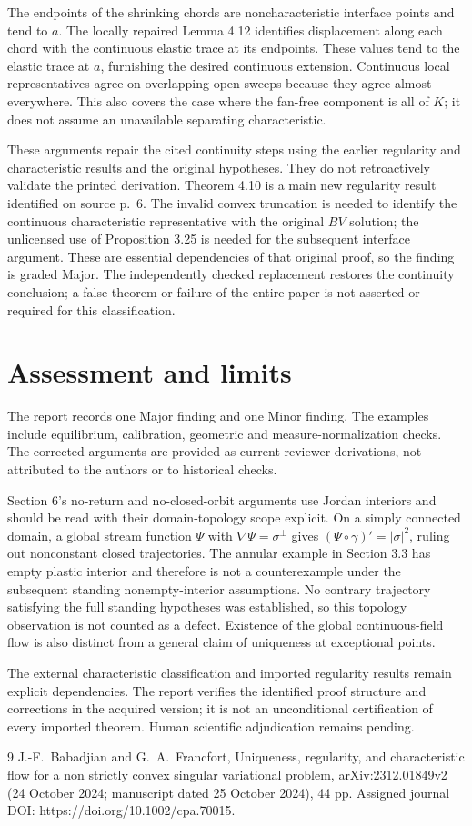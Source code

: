 \documentclass[10pt]{article}
\begin{document}
The endpoints of the shrinking chords are noncharacteristic interface points and tend to \(a\). The locally repaired Lemma 4.12 identifies displacement along each chord with the continuous elastic trace at its endpoints. These values tend to the elastic trace at \(a\), furnishing the desired continuous extension. Continuous local representatives agree on overlapping open sweeps because they agree almost everywhere. This also covers the case where the fan-free component is all of \(K\); it does not assume an unavailable separating characteristic.\par
These arguments repair the cited continuity steps using the earlier regularity and characteristic results and the original hypotheses. They do not retroactively validate the printed derivation. Theorem 4.10 is a main new regularity result identified on source p. 6. The invalid convex truncation is needed to identify the continuous characteristic representative with the original \(BV\) solution; the unlicensed use of Proposition 3.25 is needed for the subsequent interface argument. These are essential dependencies of that original proof, so the finding is graded Major. The independently checked replacement restores the continuity conclusion; a false theorem or failure of the entire paper is not asserted or required for this classification.\par
\section*{Assessment and limits}
The report records one Major finding and one Minor finding. The examples include equilibrium, calibration, geometric and measure-normalization checks. The corrected arguments are provided as current reviewer derivations, not attributed to the authors or to historical checks.\par
Section 6’s no-return and no-closed-orbit arguments use Jordan interiors and should be read with their domain-topology scope explicit. On a simply connected domain, a global stream function \(\Psi\) with \(\nabla\Psi=\sigma^\perp\) gives \((\Psi\circ\gamma)'=|\sigma|^2\), ruling out nonconstant closed trajectories. The annular example in Section 3.3 has empty plastic interior and therefore is not a counterexample under the subsequent standing nonempty-interior assumptions. No contrary trajectory satisfying the full standing hypotheses was established, so this topology observation is not counted as a defect. Existence of the global continuous-field flow is also distinct from a general claim of uniqueness at exceptional points.\par
The external characteristic classification and imported regularity results remain explicit dependencies. The report verifies the identified proof structure and corrections in the acquired version; it is not an unconditional certification of every imported theorem. Human scientific adjudication remains pending.\par
9 J.-F. Babadjian and G. A. Francfort, Uniqueness, regularity, and characteristic flow for a non strictly convex singular variational problem, arXiv:2312.01849v2 (24 October 2024; manuscript dated 25 October 2024), 44 pp. Assigned journal DOI: https://doi.org/10.1002/cpa.70015.\par
\end{document}
